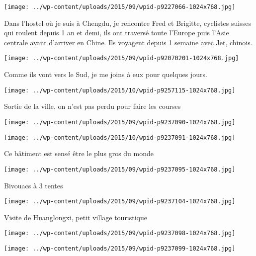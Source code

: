  \newline
\centerline{\texttt{[image: ../wp-content/uploads/2015/09/wpid-p9227066-1024x768.jpg]} } 
 \newline
 Dans l'hostel où je suis à Chengdu, je rencontre Fred et Brigitte, cyclistes suisses qui roulent depuis 1 an et demi, ils ont traversé toute l'Europe puis l'Asie centrale avant d'arriver en Chine. Ils voyagent depuis 1 semaine avec Jet, chinois. \newline
 \newline
\centerline{\texttt{[image: ../wp-content/uploads/2015/09/wpid-p92070201-1024x768.jpg]} } 
 \newline
 Comme ils vont vers le Sud, je me joins à eux pour quelques jours. \newline
 \newline
\centerline{\texttt{[image: ../wp-content/uploads/2015/10/wpid-p9257115-1024x768.jpg]} } 
 \newline
 Sortie de la ville, on n'est pas perdu pour faire les courses \newline
 \newline
\centerline{\texttt{[image: ../wp-content/uploads/2015/09/wpid-p9237090-1024x768.jpg]} } 
 \newline
 \newline
\centerline{\texttt{[image: ../wp-content/uploads/2015/10/wpid-p9237091-1024x768.jpg]} } 
 \newline
 Ce bâtiment est sensé être le plus gros du monde \newline
 \newline
\centerline{\texttt{[image: ../wp-content/uploads/2015/09/wpid-p9237095-1024x768.jpg]} } 
 \newline
 Bivouacs à 3 tentes \newline
 \newline
\centerline{\texttt{[image: ../wp-content/uploads/2015/09/wpid-p9237104-1024x768.jpg]} } 
 \newline
 Visite de Huanglongxi, petit village touristique \newline
 \newline
\centerline{\texttt{[image: ../wp-content/uploads/2015/09/wpid-p9237098-1024x768.jpg]} } 
 \newline
 \newline
\centerline{\texttt{[image: ../wp-content/uploads/2015/09/wpid-p9237099-1024x768.jpg]} } 
 \newline
